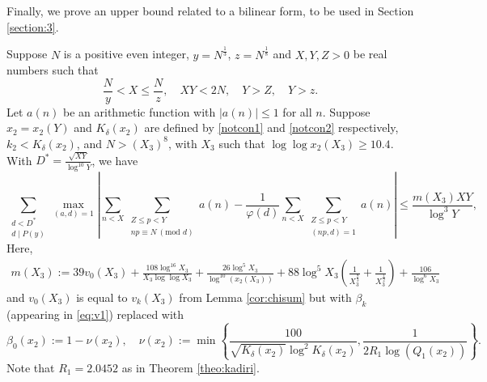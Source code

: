 \documentclass[12pt]{amsart}
\begin{document}
Finally, we prove an upper bound related to a bilinear form, to be used in Section \ref{section:3}.
\begin{lemma}
\label{lemma:bf}
Suppose $N$ is a positive even integer, $y=N^{\frac{1}{3}}$, $z=N^{\frac{1}{8}}$ and $X,Y,Z>0$ be real numbers such that
\begin{equation*}
    \frac{N}{y}<X\le \frac{N}{z}, \quad XY<2N, \quad Y>Z, \quad Y>z.
\end{equation*}
Let $a(n)$ be an arithmetic function with $\left|a(n)\right|\le 1$ for all $n$.
Suppose $x_2=x_2(Y)$ and $K_{\delta}(x_2)$ are defined by \eqref{notcon1} and \eqref{notcon2} respectively,
$k_2<K_{\delta}(x_2)$, and $N>(X_3)^8$, with $X_3$ such that $\log\log x_2(X_3)\ge 10.4$. With $D^*=\frac{\sqrt{XY}}{\log^{10} Y}$, we have
\begin{equation}\label{bilineq}
\sum_{\substack{d<D^* \\ d\mid P(y)}} \max_{(a,d)=1}\left| \sum_{n<X}\sum_{\substack{Z\le p <Y\\ np\equiv N\: (\text{mod }d)}}a(n)-\frac{1}{\varphi(d)}\sum_{n<X} \sum_{\substack{Z\le p <Y\\ (np,d)=1}}a(n)\right|\le \frac{m(X_3)XY}{\log^3 Y},
\end{equation}
Here,
\begin{align*}
m(X_3):=39 v_0(X_3)+\frac{108\log^{16} X_3}{ X_3\log \log X_3}+\frac{ 26\log^5X_3}{\log^{10}(x_2(X_3))} +88\log^5 X_3\left( \frac{1}{ X_3^{\frac{8}{3}}}+\frac{1}{ X_3^{\frac{1}{2}}}\right)+\frac{106}{\log^6 X_3}
\end{align*}
and $v_0(X_3)$ is equal to $v_k(X_3)$ from Lemma \ref{cor:chisum} but with $\beta_k$ (appearing in \eqref{eq:v1}) replaced with
\begin{equation}\label{siegelmin2}
    \beta_0(x_2):=1-\nu(x_2),\quad \nu(x_2):=\min\left\{\frac{100}{\sqrt{K_{\delta}(x_2)}\log^2 K_{\delta}(x_2)},\frac{1}{2R_1\log(Q_1(x_2))}\right\}.
\end{equation}
Note that $R_1=2.0452$ as in Theorem \ref{theo:kadiri}.
\end{lemma}
\end{document}
